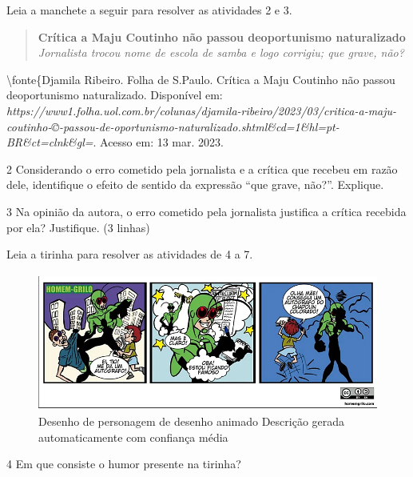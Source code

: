 Leia a manchete a seguir para resolver as atividades 2 e 3.

\begin{quote}
\textbf{Crítica a Maju Coutinho não passou deoportunismo naturalizado}
\emph{Jornalista trocou nome de escola de samba e logo corrigiu; que
grave, não?}
\end{quote}

\textbackslash fonte\{Djamila Ribeiro. Folha de S.Paulo. Crítica a Maju
Coutinho não passou deoportunismo naturalizado. Disponível em:
\emph{https://www1.folha.uol.com.br/colunas/djamila-ribeiro/2023/03/critica-a-maju-coutinho-©-passou-de-oportunismo-naturalizado.shtml\&cd=1\&hl=pt-BR\&ct=clnk\&gl=}.
Acesso em: 13 mar. 2023.

\num{2} Considerando o erro cometido pela jornalista e a crítica que
recebeu em razão dele, identifique o efeito de sentido da expressão
``que grave, não?''. Explique.


\num{3} Na opinião da autora, o erro cometido pela jornalista justifica
a crítica recebida por ela? Justifique. (3 linhas)


Leia a tirinha para resolver as atividades de 4 a 7.

\begin{figure}
\centering
\includegraphics[width=5.40625in,height=1.77973in]{./imgSAEB_8_POR/media/image8.png}
\caption{Desenho de personagem de desenho animado Descrição gerada
automaticamente com confiança média}
\end{figure}

\num{4} Em que consiste o humor presente na tirinha?



